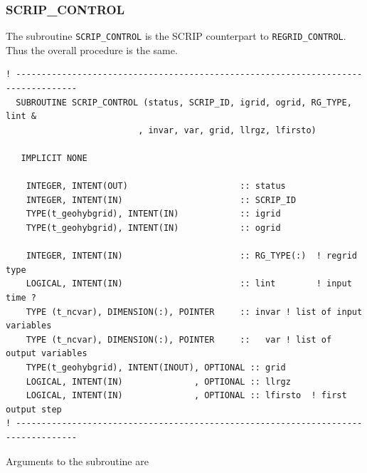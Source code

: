 \documentclass[11pt,twoside]{article}
\begin{document}
\subsubsection{SCRIP\_CONTROL\label{SCRPCNTRL}}
The subroutine \verb|SCRIP_CONTROL| is the SCRIP counterpart
to \verb|REGRID_CONTROL|. Thus the overall procedure is the same.
\begin{verbatim}
! ----------------------------------------------------------------------------------
  SUBROUTINE SCRIP_CONTROL (status, SCRIP_ID, igrid, ogrid, RG_TYPE, lint &
                          , invar, var, grid, llrgz, lfirsto)

   IMPLICIT NONE

    INTEGER, INTENT(OUT)                      :: status
    INTEGER, INTENT(IN)                       :: SCRIP_ID
    TYPE(t_geohybgrid), INTENT(IN)            :: igrid
    TYPE(t_geohybgrid), INTENT(IN)            :: ogrid
    
    INTEGER, INTENT(IN)                       :: RG_TYPE(:)  ! regrid type
    LOGICAL, INTENT(IN)                       :: lint        ! input time ?
    TYPE (t_ncvar), DIMENSION(:), POINTER     :: invar ! list of input  variables
    TYPE (t_ncvar), DIMENSION(:), POINTER     ::   var ! list of output variables
    TYPE(t_geohybgrid), INTENT(INOUT), OPTIONAL :: grid
    LOGICAL, INTENT(IN)              , OPTIONAL :: llrgz
    LOGICAL, INTENT(IN)              , OPTIONAL :: lfirsto  ! first output step
! ----------------------------------------------------------------------------------
\end{verbatim}
Arguments to the subroutine are
\end{document}
